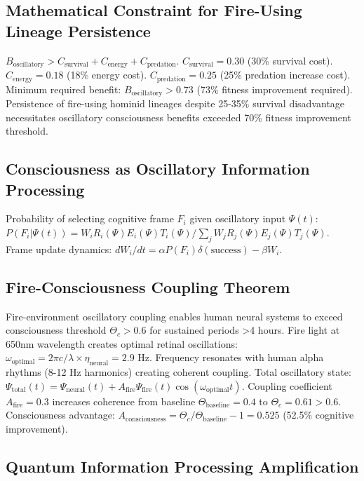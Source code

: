 \documentclass[12pt,a4paper]{article}
\begin{document}
\subsection{Mathematical Constraint for Fire-Using Lineage Persistence}

$B_{\text{oscillatory}} > C_{\text{survival}} + C_{\text{energy}} + C_{\text{predation}}$. $C_{\text{survival}} = 0.30$ (30\% survival cost). $C_{\text{energy}} = 0.18$ (18\% energy cost). $C_{\text{predation}} = 0.25$ (25\% predation increase cost). Minimum required benefit: $B_{\text{oscillatory}} > 0.73$ (73\% fitness improvement required). Persistence of fire-using hominid lineages despite 25-35\% survival disadvantage necessitates oscillatory consciousness benefits exceeded 70\% fitness improvement threshold.

\subsection{Consciousness as Oscillatory Information Processing}

Probability of selecting cognitive frame $F_i$ given oscillatory input $\Psi(t)$: $P(F_i | \Psi(t)) = W_i R_i(\Psi) E_i(\Psi) T_i(\Psi) / \sum_j W_j R_j(\Psi) E_j(\Psi) T_j(\Psi)$. Frame update dynamics: $dW_i/dt = \alpha P(F_i) \delta(\text{success}) - \beta W_i$.

\subsection{Fire-Consciousness Coupling Theorem}

Fire-environment oscillatory coupling enables human neural systems to exceed consciousness threshold $\Theta_c > 0.6$ for sustained periods >4 hours. Fire light at 650nm wavelength creates optimal retinal oscillations: $\omega_{\text{optimal}} = 2\pi c/\lambda \times \eta_{\text{neural}} = 2.9$ Hz. Frequency resonates with human alpha rhythms (8-12 Hz harmonics) creating coherent coupling. Total oscillatory state: $\Psi_{\text{total}}(t) = \Psi_{\text{neural}}(t) + A_{\text{fire}} \Psi_{\text{fire}}(t)\cos(\omega_{\text{optimal}} t)$. Coupling coefficient $A_{\text{fire}} = 0.3$ increases coherence from baseline $\Theta_{\text{baseline}} = 0.4$ to $\Theta_c = 0.61 > 0.6$. Consciousness advantage: $A_{\text{consciousness}} = \Theta_c/\Theta_{\text{baseline}} - 1 = 0.525$ (52.5\% cognitive improvement).

\subsection{Quantum Information Processing Amplification}
\end{document}
